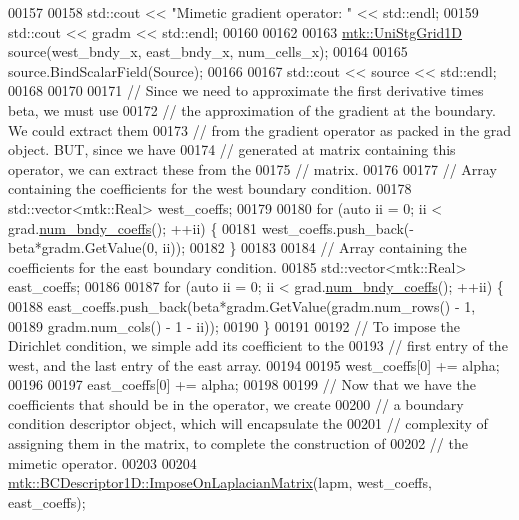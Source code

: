 \begin{DoxyCode}
00157 
00158   std::cout << \textcolor{stringliteral}{"Mimetic gradient operator: "} << std::endl;
00159   std::cout << gradm << std::endl;
00160 
00162 
00163   \hyperlink{classmtk_1_1UniStgGrid1D}{mtk::UniStgGrid1D} source(west\_bndy\_x, east\_bndy\_x, num\_cells\_x);
00164 
00165   source.BindScalarField(Source);
00166 
00167   std::cout << source << std::endl;
00168 
00170 
00171   \textcolor{comment}{// Since we need to approximate the first derivative times beta, we must use}
00172   \textcolor{comment}{// the approximation of the gradient at the boundary. We could extract them}
00173   \textcolor{comment}{// from the gradient operator as packed in the grad object. BUT, since we have}
00174   \textcolor{comment}{// generated at matrix containing this operator, we can extract these from the}
00175   \textcolor{comment}{// matrix.}
00176 
00177   \textcolor{comment}{// Array containing the coefficients for the west boundary condition.}
00178   std::vector<mtk::Real> west\_coeffs;
00179 
00180   \textcolor{keywordflow}{for} (\textcolor{keyword}{auto} ii = 0; ii < grad.\hyperlink{classmtk_1_1Grad1D_a7168205c21ba00012558f8bba069c119}{num\_bndy\_coeffs}(); ++ii) \{
00181     west\_coeffs.push\_back(-beta*gradm.GetValue(0, ii));
00182   \}
00183 
00184   \textcolor{comment}{// Array containing the coefficients for the east boundary condition.}
00185   std::vector<mtk::Real> east\_coeffs;
00186 
00187   \textcolor{keywordflow}{for} (\textcolor{keyword}{auto} ii = 0; ii < grad.\hyperlink{classmtk_1_1Grad1D_a7168205c21ba00012558f8bba069c119}{num\_bndy\_coeffs}(); ++ii) \{
00188     east\_coeffs.push\_back(beta*gradm.GetValue(gradm.num\_rows() - 1,
00189                                               gradm.num\_cols() - 1 - ii));
00190   \}
00191 
00192   \textcolor{comment}{// To impose the Dirichlet condition, we simple add its coefficient to the}
00193   \textcolor{comment}{// first entry of the west, and the last entry of the east array.}
00194 
00195   west\_coeffs[0] += alpha;
00196 
00197   east\_coeffs[0] += alpha;
00198 
00199   \textcolor{comment}{// Now that we have the coefficients that should be in the operator, we create}
00200   \textcolor{comment}{// a boundary condition descriptor object, which will encapsulate the}
00201   \textcolor{comment}{// complexity of assigning them in the matrix, to complete the construction of}
00202   \textcolor{comment}{// the mimetic operator.}
00203 
00204   \hyperlink{classmtk_1_1BCDescriptor1D_a33e51235eaa930e4470f027001a023cf}{mtk::BCDescriptor1D::ImposeOnLaplacianMatrix}(lapm, 
      west\_coeffs, east\_coeffs);

\end{DoxyCode}
